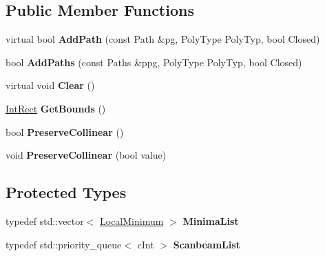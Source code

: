 \subsection*{Public Member Functions}
\begin{DoxyCompactItemize}
\item 
\mbox{\label{class_clipper_lib_1_1_clipper_base_a7545ac6e146894dc8416887eadd01dba}} 
virtual bool {\bfseries Add\+Path} (const Path \&pg, Poly\+Type Poly\+Typ, bool Closed)
\item 
\mbox{\label{class_clipper_lib_1_1_clipper_base_a2395967b47fb9f3f5846e2bf56c18f67}} 
bool {\bfseries Add\+Paths} (const Paths \&ppg, Poly\+Type Poly\+Typ, bool Closed)
\item 
\mbox{\label{class_clipper_lib_1_1_clipper_base_a5690952fe8c2cb047025566405827821}} 
virtual void {\bfseries Clear} ()
\item 
\mbox{\label{class_clipper_lib_1_1_clipper_base_a5590a5454248ac3f6beeba7f9690f62e}} 
\hyperlink{struct_clipper_lib_1_1_int_rect}{Int\+Rect} {\bfseries Get\+Bounds} ()
\item 
\mbox{\label{class_clipper_lib_1_1_clipper_base_a95c47199aeb139b13059968bc6056f44}} 
bool {\bfseries Preserve\+Collinear} ()
\item 
\mbox{\label{class_clipper_lib_1_1_clipper_base_aa827cfffd9be40dba7d503a3da708b91}} 
void {\bfseries Preserve\+Collinear} (bool value)
\end{DoxyCompactItemize}
\subsection*{Protected Types}
\begin{DoxyCompactItemize}
\item 
\mbox{\label{class_clipper_lib_1_1_clipper_base_addb22572066d3983dcd5797c542df00b}} 
typedef std\+::vector$<$ \hyperlink{struct_clipper_lib_1_1_local_minimum}{Local\+Minimum} $>$ {\bfseries Minima\+List}
\item 
\mbox{\label{class_clipper_lib_1_1_clipper_base_a517d04b2a0f0bae13a64a819b3bd429e}} 
typedef std\+::priority\+\_\+queue$<$ c\+Int $>$ {\bfseries Scanbeam\+List}
\end{DoxyCompactItemize}

